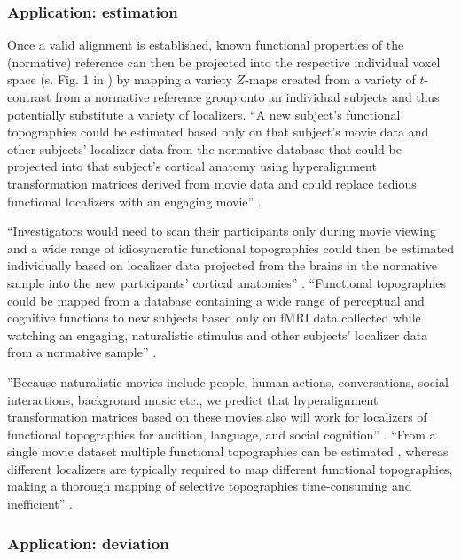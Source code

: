 \subsubsection{Application: estimation}
%
Once a valid alignment is established, known functional properties of the
(normative) reference can then be projected into the respective individual voxel
space (s. Fig. 1 in \citep{nishimoto2016lining}) by mapping a variety $Z$-maps
created from a variety of $t$-contrast from a normative reference group onto an
individual subjects and thus potentially substitute a variety of localizers.
%
``A new subject's functional topographies could be estimated based only on that
subject's movie data and other subjects' localizer data from the normative
database that could be projected into that subject's cortical anatomy using
hyperalignment transformation matrices derived from movie data and could replace
tedious functional localizers with an engaging movie''
\citep{jiahui2020predicting}.

%
``Investigators would need to scan their participants only during movie viewing
and a wide range of idiosyncratic functional topographies could then be
estimated individually based on localizer data projected from the brains in the
normative sample into the new participants' cortical anatomies''
\citep{jiahui2020predicting}.
%
``Functional topographies could be mapped from a database containing a wide
range of perceptual and cognitive functions to new subjects based only on fMRI
data collected while watching an engaging, naturalistic stimulus and other
subjects' localizer data from a normative sample'' \citep{jiahui2020predicting}.

%
''Because naturalistic movies include people, human actions, conversations,
social interactions, background music etc., we predict that hyperalignment
transformation matrices based on these movies also will work for localizers of
functional topographies for audition, language, and social cognition''
\citep{jiahui2020predicting}.
%
``From a single movie dataset multiple functional topographies can be estimated
\citep{guntupalli2016model}, whereas different localizers are typically required
to map different functional topographies, making a thorough mapping of selective
topographies time-consuming and inefficient'' \citep{jiahui2020predicting}.



\subsubsection{Application: deviation}

